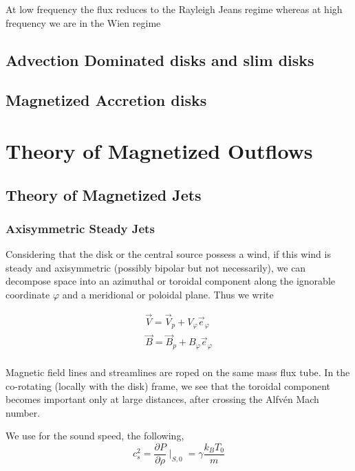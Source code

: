 \documentclass[10pt,a4paper,english]{article}
\begin{document}
At low frequency the flux reduces to the Rayleigh Jeans regime whereas at high
frequency we are in the Wien regime

\subsection{Advection Dominated disks and slim disks}
\subsection{Magnetized Accretion disks}

\section{Theory of Magnetized Outflows}
\subsection{Theory of Magnetized Jets}
\subsubsection{Axisymmetric Steady Jets}

Considering that the disk or the central source possess a wind, if this wind is steady and axisymmetric (possibly bipolar but not necessarily), we can decompose space into an azimuthal or toroidal component along the ignorable coordinate $\varphi$ and a meridional or poloidal plane. Thus we write

\begin{align*}
    \overrightarrow{V} = \overrightarrow{V}_{p} + V_{\varphi}\overrightarrow{e}_{\varphi} \\
    \overrightarrow{B} = \overrightarrow{B}_{p} + B_{\varphi}\overrightarrow{e}_{\varphi}  \\
\end{align*}

Magnetic field lines and streamlines are roped on the same mass flux tube. In the co-rotating (locally with the disk) frame, we see that the toroidal component becomes important only at large distances, after crossing the Alfvén Mach number.
\\

We use for the sound speed, the following,
\begin{equation}
   c^{2}_{s} = \frac{\partial P}{\partial\rho}\mid_{S,0} = \gamma \frac{k_{B}T_{0}}{m}
\end{equation}
\end{document}
